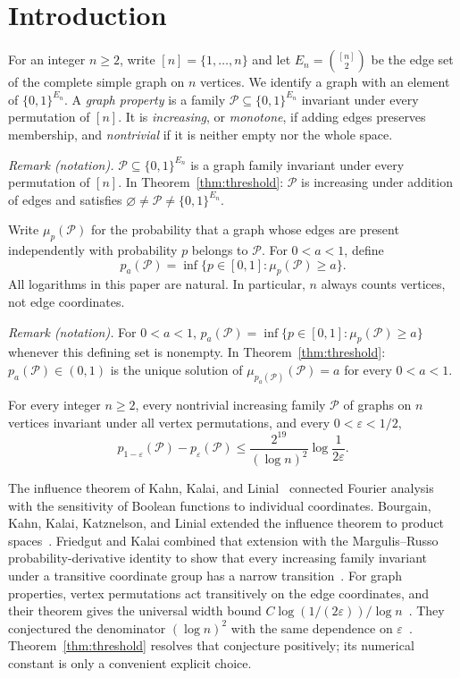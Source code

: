 \section{Introduction}
\label{sec:introduction}

For an integer $n\ge2$, write $[n]=\{1,\ldots,n\}$ and let $E_n=\binom{[n]}2$ be the edge set of the complete simple graph on $n$ vertices. We identify a graph with an element of $\{0,1\}^{E_n}$. A \emph{graph property} is a family $\mathcal P\subseteq\{0,1\}^{E_n}$ invariant under every permutation of $[n]$. It is \emph{increasing}, or \emph{monotone}, if adding edges preserves membership, and \emph{nontrivial} if it is neither empty nor the whole space.

\noindent\textit{Remark (notation).} $\mathcal P\subseteq\{0,1\}^{E_n}$ is a graph family invariant under every permutation of $[n]$. In Theorem~\ref{thm:threshold}: $\mathcal P$ is increasing under addition of edges and satisfies $\varnothing\ne\mathcal P\ne\{0,1\}^{E_n}$.


Write $\mu_p(\mathcal P)$ for the probability that a graph whose edges are present independently with probability $p$ belongs to $\mathcal P$. For $0<a<1$, define
\[
 p_a(\mathcal P)=\inf\{p\in[0,1]:\mu_p(\mathcal P)\ge a\}.
\]
All logarithms in this paper are natural. In particular, $n$ always counts vertices, not edge coordinates.

\noindent\textit{Remark (notation).} For $0<a<1$, $p_a(\mathcal P)=\inf\{p\in[0,1]:\mu_p(\mathcal P)\ge a\}$ whenever this defining set is nonempty. In Theorem~\ref{thm:threshold}: $p_a(\mathcal P)\in(0,1)$ is the unique solution of $\mu_{p_a(\mathcal P)}(\mathcal P)=a$ for every $0<a<1$.


\begin{theorem}
\label{thm:threshold}
For every integer $n\ge2$, every nontrivial increasing family $\mathcal P$ of graphs on $n$ vertices invariant under all vertex permutations, and every $0<\varepsilon<1/2$,
\begin{equation}
\label{eq:threshold}
 p_{1-\varepsilon}(\mathcal P)-p_\varepsilon(\mathcal P)
 \le \frac{2^{19}}{(\log n)^2}\log\frac1{2\varepsilon}.
\end{equation}
\end{theorem}

The influence theorem of Kahn, Kalai, and Linial~\cite{KKL88}
connected Fourier analysis with the sensitivity of Boolean functions
to individual coordinates. Bourgain, Kahn, Kalai, Katznelson, and
Linial extended the influence theorem to product
spaces~\cite{BKKKL92}. Friedgut and Kalai combined that extension
with the Margulis--Russo probability-derivative identity to show that
every increasing family invariant under a transitive coordinate group
has a narrow transition~\cite[Section~2]{FK96}. For graph properties,
vertex permutations act transitively on the edge coordinates, and their
theorem gives the universal width bound
$C\log(1/(2\varepsilon))/\log n$~\cite[Theorem~1.1]{FK96}.
They conjectured the denominator $(\log n)^2$ with the same dependence
on $\varepsilon$~\cite[Conjecture~1.2]{FK96}.
Theorem~\ref{thm:threshold} resolves that conjecture positively;
its numerical constant is only a convenient explicit choice.

